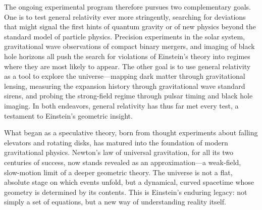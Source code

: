 \documentclass[12pt, a4paper]{article}
\begin{document}
	The ongoing experimental program therefore pursues two complementary goals. One is to test general relativity ever more stringently, searching for deviations that might signal the first hints of quantum gravity or of new physics beyond the standard model of particle physics. Precision experiments in the solar system, gravitational wave observations of compact binary mergers, and imaging of black hole horizons all push the search for violations of Einstein's theory into regimes where they are most likely to appear. The other goal is to use general relativity as a tool to explore the universe—mapping dark matter through gravitational lensing, measuring the expansion history through gravitational wave standard sirens, and probing the strong-field regime through pulsar timing and black hole imaging. In both endeavors, general relativity has thus far met every test, a testament to Einstein's geometric insight.
	
	What began as a speculative theory, born from thought experiments about falling elevators and rotating disks, has matured into the foundation of modern gravitational physics. Newton's law of universal gravitation, for all its two centuries of success, now stands revealed as an approximation—a weak-field, slow-motion limit of a deeper geometric theory. The universe is not a flat, absolute stage on which events unfold, but a dynamical, curved spacetime whose geometry is determined by its contents. This is Einstein's enduring legacy: not simply a set of equations, but a new way of understanding reality itself.
	
	\newpage
	
	
\end{document}
